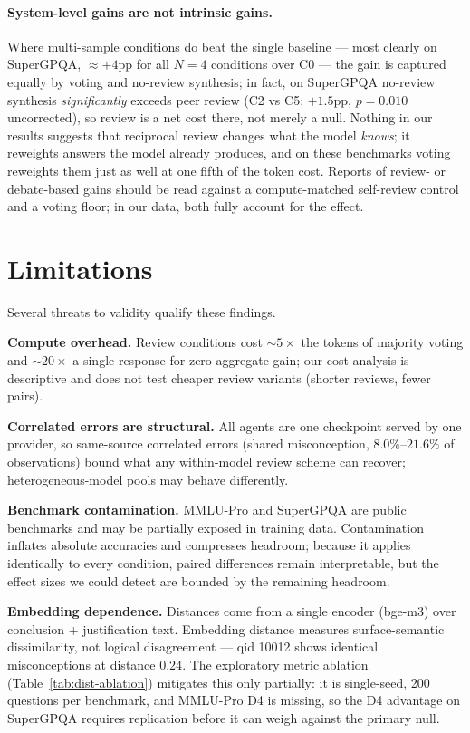 \documentclass[11pt]{article}
\begin{document}
\paragraph{System-level gains are not intrinsic gains.}
Where multi-sample conditions do beat the single baseline --- most clearly on SuperGPQA, ${\approx}+4$pp for all $N{=}4$ conditions over C0 --- the gain is captured equally by voting and no-review synthesis; in fact, on SuperGPQA no-review synthesis \emph{significantly} exceeds peer review (C2 vs C5: $+1.5$pp, $p=0.010$ uncorrected), so review is a net cost there, not merely a null. Nothing in our results suggests that reciprocal review changes what the model \emph{knows}; it reweights answers the model already produces, and on these benchmarks voting reweights them just as well at one fifth of the token cost. Reports of review- or debate-based gains should be read against a compute-matched self-review control and a voting floor; in our data, both fully account for the effect.

\section{Limitations}
\label{sec:limitations}

Several threats to validity qualify these findings.

\textbf{Compute overhead.} Review conditions cost ${\sim}5\times$ the tokens of majority voting and ${\sim}20\times$ a single response for zero aggregate gain; our cost analysis is descriptive and does not test cheaper review variants (shorter reviews, fewer pairs).

\textbf{Correlated errors are structural.} All agents are one checkpoint served by one provider, so same-source correlated errors (shared misconception, $8.0\%$--$21.6\%$ of observations) bound what any within-model review scheme can recover; heterogeneous-model pools may behave differently.

\textbf{Benchmark contamination.} MMLU-Pro and SuperGPQA are public benchmarks and may be partially exposed in training data. Contamination inflates absolute accuracies and compresses headroom; because it applies identically to every condition, paired differences remain interpretable, but the effect sizes we could detect are bounded by the remaining headroom.

\textbf{Embedding dependence.} Distances come from a single encoder (bge-m3) over conclusion + justification text. Embedding distance measures surface-semantic dissimilarity, not logical disagreement --- qid 10012 shows identical misconceptions at distance $0.24$. The exploratory metric ablation (Table~\ref{tab:dist-ablation}) mitigates this only partially: it is single-seed, 200 questions per benchmark, and MMLU-Pro D4 is missing, so the D4 advantage on SuperGPQA requires replication before it can weigh against the primary null.
\end{document}
